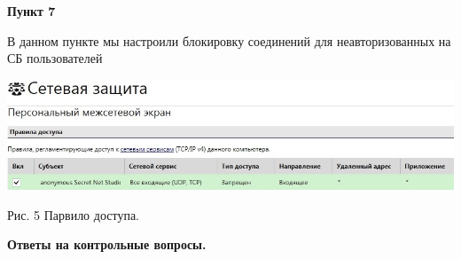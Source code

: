 \documentclass[a4paper,14pt]{extarticle}
\begin{document}
    \textbf{Пункт 7}
    \vspace{-3ex}
    \begin{center}
        \singlespacing
        В данном пункте мы настроили блокировку соединений для неавторизованных на СБ пользователей

        \includegraphics[scale=0.5]{pics/7.jpg}

        Рис. 5 Парвило доступа.
    \end{center}

    \textbf{Ответы на контрольные вопросы.}
\end{document}
